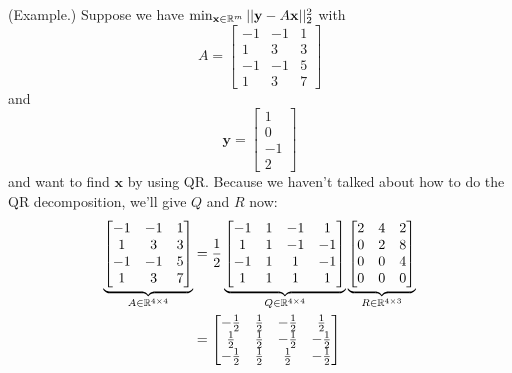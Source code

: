 \documentclass[letterpaper]{article}
\newcommand{\0}{\mathbf{0}}
\newcommand{\y}{\mathbf{y}}
\newcommand{\x}{\mathbf{x}}
\begin{document}
\begin{mdframed}
    (Example.) Suppose we have $\min_{\x \in \R^m} ||\y - A\x||_2^2$ with \[A = \begin{bmatrix}
        -1 & -1 & 1 \\ 
        1 & 3 & 3 \\ 
        -1 & -1 & 5 \\ 
        1 & 3 & 7
    \end{bmatrix}\] and \[\y = \begin{bmatrix}
        1 \\ 0 \\ -1 \\ 2
    \end{bmatrix}\] and want to find $\x$ by using QR. Because we haven't talked about how to do the QR decomposition, we'll give $Q$ and $R$ now: 
    \begin{equation*}
        \begin{aligned}
            \underbrace{\begin{bmatrix}
                -1 & -1 & 1 \\ 
                1 & 3 & 3 \\ 
                -1 & -1 & 5 \\ 
                1 & 3 & 7
            \end{bmatrix}}_{A \in \mathbb{R}^{4 \times 4}} &= \frac{1}{2} \underbrace{\begin{bmatrix}
                -1 & 1 & -1 & 1 \\ 
                1 & 1 & -1 & -1 \\ 
                -1 & 1 & 1 & -1 \\ 
                1 & 1 & 1 & 1
            \end{bmatrix}}_{Q \in \mathbb{R}^{4 \times 4}} \underbrace{\begin{bmatrix}
                2 & 4 & 2 \\ 
                0 & 2 & 8 \\ 
                0 & 0 & 4 \\ 
                0 & 0 & 0
            \end{bmatrix}}_{R \in \mathbb{R}^{4 \times 3}} \\ 
                &= \begin{bmatrix}
                    -\frac{1}{2} & \frac{1}{2} & -\frac{1}{2} & \frac{1}{2} \\ 
                    \frac{1}{2} & \frac{1}{2} & -\frac{1}{2} & -\frac{1}{2} \\ 
                    -\frac{1}{2} & \frac{1}{2} & \frac{1}{2} & -\frac{1}{2} \\ 

\end{bmatrix}
\end{aligned}
\end{equation*}
\end{mdframed}
\end{document}
